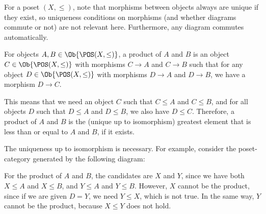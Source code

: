 \begin{solution}\label{sol:product_posetcat}
	For a poset $ (X, \leq) $, note that morphisms between objects always are unique if they exist, so uniqueness conditions on morphisms (and whether diagrams commute or not) are not relevant here.
	Furthermore, any diagram commutes automatically.
	
	For objects $ A, B \in \Ob{\POS(X, \leq)} $, a product of $ A $ and $ B $ is an object $ C \in \Ob{\POS(X, \leq)} $ with morphisms $ C \to A $ and $ C \to B $ such that for any object $ D \in \Ob{\POS(X, \leq)} $ with morphisms $ D \to A $ and $ D \to B $, we have a morphism $ D \to C $.

	This means that we need an object $ C $ such that $ C \leq A $ and $ C \leq B $, and for all objects $ D $ such that $ D \leq A $ and $ D \leq B $, we also have $ D \leq C $. Therefore, a product of $ A $ and $ B $ is the (unique up to isomorphism) greatest element that is less than or equal to $ A $ and $ B $, if it exists.

	\begin{rem}
		The uniqueness up to isomorphism is necessary. For example, consider the poset-category generated by the following diagram:
		\begin{center}
		\end{center}
		For the product of $ A $ and $ B $, the candidates are $ X $ and $ Y $, since we have both $ X \leq A $ and $ X \leq B $, and $ Y \leq A $ and $ Y \leq B $. However, $ X $ cannot be the product, since if we are given $ D = Y $, we need $ Y \leq X $, which is not true. In the same way, $ Y $ cannot be the product, because $ X \leq Y $ does not hold.
	\end{rem}
\end{solution}


